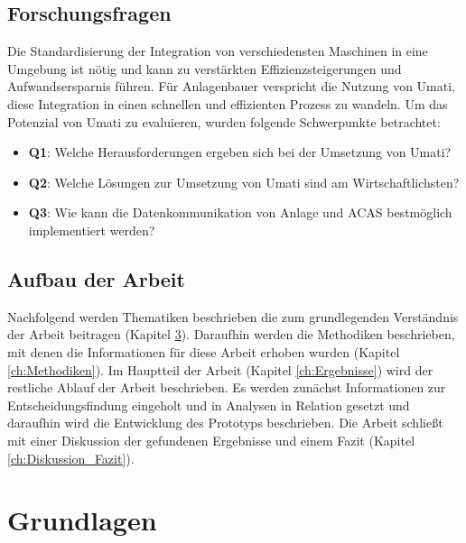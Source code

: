 \documentclass[a4paper, 12pt, oneside]{scrbook}
\begin{document}
	
	\section{Forschungsfragen}
	
	Die Standardisierung der Integration von verschiedensten Maschinen in eine Umgebung ist nötig und kann zu verstärkten Effizienzsteigerungen und Aufwandsersparnis führen. Für Anlagenbauer verspricht die Nutzung von Umati, diese Integration in einen schnellen und effizienten Prozess zu wandeln. Um das Potenzial von Umati zu evaluieren, wurden folgende Schwerpunkte betrachtet:
	
	\begin{itemize}
		\item \textbf{Q1}: Welche Herausforderungen ergeben sich bei der Umsetzung von Umati?
		\item \textbf{Q2}: Welche Lösungen zur Umsetzung von Umati sind am Wirtschaftlichsten?
		\item \textbf{Q3}: Wie kann die Datenkommunikation von Anlage und ACAS bestmöglich implementiert werden?
	\end{itemize}
	
	\section{Aufbau der Arbeit}
	
	Nachfolgend werden Thematiken beschrieben die zum grundlegenden Verständnis der Arbeit beitragen (Kapitel \ref{ch:Grundlagen}). Daraufhin werden die Methodiken beschrieben, mit denen die Informationen für diese Arbeit erhoben wurden (Kapitel \ref{ch:Methodiken}). Im Hauptteil der Arbeit (Kapitel \ref{ch:Ergebnisse}) wird der restliche Ablauf der Arbeit beschrieben. Es werden zunächst Informationen zur Entscheidungsfindung eingeholt und in Analysen in Relation gesetzt und daraufhin wird die Entwicklung des Prototyps beschrieben. Die Arbeit schließt mit einer Diskussion der gefundenen Ergebnisse und einem Fazit (Kapitel \ref{ch:Diskussion_Fazit}).
	
	
\chapter{Grundlagen}\label{ch:Grundlagen}
	
\end{document}
